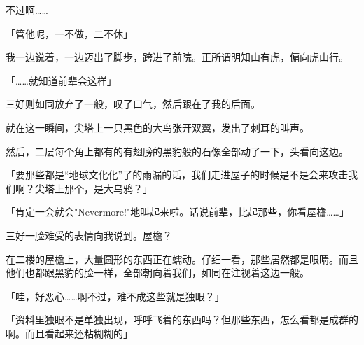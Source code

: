 不过啊……

「管他呢，一不做，二不休」

我一边说着，一边迈出了脚步，跨进了前院。正所谓明知山有虎，偏向虎山行。

「……就知道前辈会这样」

三好则如同放弃了一般，叹了口气，然后跟在了我的后面。

就在这一瞬间，尖塔上一只黑色的大鸟张开双翼，发出了刺耳的叫声。

然后，二层每个角上都有的有翅膀的黑豹般的石像全部动了一下，头看向这边。

「要那些都是“地球文化化”了的雨漏的话，我们走进屋子的时候是不是会来攻击我们啊？尖塔上那个，是大乌鸦？」

「肯定一会就会"Nevermore!"地叫起来啦。话说前辈，比起那些，你看屋檐……」

三好一脸难受的表情向我说到。屋檐？

在二楼的屋檐上，大量圆形的东西正在蠕动。仔细一看，那些居然都是眼睛。而且他们也都跟黑豹的脸一样，全部朝向着我们，如同在注视着这边一般。

「哇，好恶心……啊不过，难不成这些就是独眼？」

「资料里独眼不是单独出现，呼呼飞着的东西吗？但那些东西，怎么看都是成群的啊。而且看起来还粘糊糊的」

